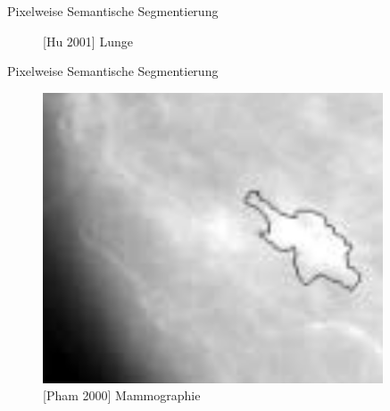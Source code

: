 \begin{frame}{Pixelweise Semantische Segmentierung}
\begin{figure}[ht]
\begin{minipage}[b]{0.45\linewidth}
            \caption{[Hu 2001] Lunge}
            \label{fig:lung}
        \end{minipage}
    \end{figure}
\end{frame}

\begin{frame}{Pixelweise Semantische Segmentierung}
    \begin{figure}[ht]
        \begin{minipage}[b]{0.45\linewidth}
            \centering
            \includegraphics[width=\textwidth]{../images/mammography.png}
            \caption{[Pham 2000] Mammographie}
            \label{fig:mammographie}
        \end{minipage}
        \hspace{0.5cm}
        \begin{minipage}[b]{0.45\linewidth}
            \centering

\end{minipage}
\end{figure}
\end{frame}
